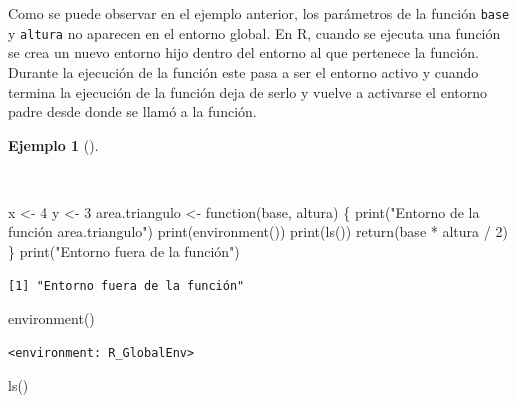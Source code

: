 \documentclass[
  a4paper,
]{scrreport}
\newenvironment{Shaded}{\begin{snugshade}}{\end{snugshade}}
\newcommand{\ControlFlowTok}[1]{\textcolor[rgb]{0.00,0.23,0.31}{#1}}
\newcommand{\DecValTok}[1]{\textcolor[rgb]{0.68,0.00,0.00}{#1}}
\newcommand{\FunctionTok}[1]{\textcolor[rgb]{0.28,0.35,0.67}{#1}}
\newcommand{\NormalTok}[1]{\textcolor[rgb]{0.00,0.23,0.31}{#1}}
\newcommand{\OtherTok}[1]{\textcolor[rgb]{0.00,0.23,0.31}{#1}}
\newcommand{\SpecialCharTok}[1]{\textcolor[rgb]{0.37,0.37,0.37}{#1}}
\newcommand{\StringTok}[1]{\textcolor[rgb]{0.13,0.47,0.30}{#1}}
\theoremstyle{definition}
\theoremstyle{definition}
\newtheorem{example}{Ejemplo}[chapter]
\theoremstyle{remark}
\begin{document}
Como se puede observar en el ejemplo anterior, los parámetros de la
función \texttt{base} y \texttt{altura} no aparecen en el entorno
global. En R, cuando se ejecuta una función se crea un nuevo entorno
hijo dentro del entorno al que pertenece la función. Durante la
ejecución de la función este pasa a ser el entorno activo y cuando
termina la ejecución de la función deja de serlo y vuelve a activarse el
entorno padre desde donde se llamó a la función.

\begin{example}[]\protect\hypertarget{exm-activacion-entorno-funcion}{}\label{exm-activacion-entorno-funcion}

~

\begin{Shaded}
\begin{Highlighting}[]
\NormalTok{x }\OtherTok{\textless{}{-}} \DecValTok{4}
\NormalTok{y }\OtherTok{\textless{}{-}} \DecValTok{3}
\NormalTok{area.triangulo }\OtherTok{\textless{}{-}} \ControlFlowTok{function}\NormalTok{(base, altura) \{}
  \FunctionTok{print}\NormalTok{(}\StringTok{"Entorno de la función area.triangulo"}\NormalTok{) }
  \FunctionTok{print}\NormalTok{(}\FunctionTok{environment}\NormalTok{())}
  \FunctionTok{print}\NormalTok{(}\FunctionTok{ls}\NormalTok{())}
  \FunctionTok{return}\NormalTok{(base }\SpecialCharTok{*}\NormalTok{ altura }\SpecialCharTok{/} \DecValTok{2}\NormalTok{)}
\NormalTok{\}}
\FunctionTok{print}\NormalTok{(}\StringTok{"Entorno fuera de la función"}\NormalTok{)}
\end{Highlighting}
\end{Shaded}

\begin{verbatim}
[1] "Entorno fuera de la función"
\end{verbatim}

\begin{Shaded}
\begin{Highlighting}[]
\FunctionTok{environment}\NormalTok{()}
\end{Highlighting}
\end{Shaded}

\begin{verbatim}
<environment: R_GlobalEnv>
\end{verbatim}

\begin{Shaded}
\begin{Highlighting}[]
\FunctionTok{ls}\NormalTok{()}
\end{Highlighting}
\end{Shaded}


\end{example}
\end{document}
